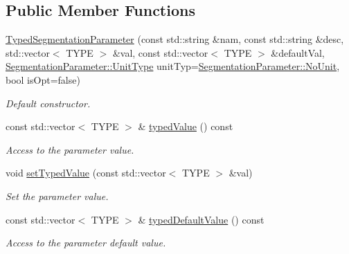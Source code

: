 \subsection*{Public Member Functions}
\begin{DoxyCompactItemize}
\item 
\hyperlink{class_d_d4hep_1_1_d_d_segmentation_1_1_typed_segmentation_parameter_3_01std_1_1vector_3_01_t_y_p_e_01_4_01_4_a4deba5d43284deab4fba1c05f0cbb563}{Typed\+Segmentation\+Parameter} (const std\+::string \&nam, const std\+::string \&desc, std\+::vector$<$ T\+Y\+PE $>$ \&val, const std\+::vector$<$ T\+Y\+PE $>$ \&default\+Val, \hyperlink{class_d_d4hep_1_1_d_d_segmentation_1_1_segmentation_parameter_a36f5f8b8d812b2a2b81363377565d8d4}{Segmentation\+Parameter\+::\+Unit\+Type} unit\+Typ=\hyperlink{class_d_d4hep_1_1_d_d_segmentation_1_1_segmentation_parameter_a36f5f8b8d812b2a2b81363377565d8d4ab217a538e0ac077135786260a2221c14}{Segmentation\+Parameter\+::\+No\+Unit}, bool is\+Opt=false)
\begin{DoxyCompactList}\small\item\em Default constructor. \end{DoxyCompactList}\item 
const std\+::vector$<$ T\+Y\+PE $>$ \& \hyperlink{class_d_d4hep_1_1_d_d_segmentation_1_1_typed_segmentation_parameter_3_01std_1_1vector_3_01_t_y_p_e_01_4_01_4_ad28706ead2996fc42cee6a75325511ca}{typed\+Value} () const
\begin{DoxyCompactList}\small\item\em Access to the parameter value. \end{DoxyCompactList}\item 
void \hyperlink{class_d_d4hep_1_1_d_d_segmentation_1_1_typed_segmentation_parameter_3_01std_1_1vector_3_01_t_y_p_e_01_4_01_4_ab26ff43253babc240b2f92ff02b59d3b}{set\+Typed\+Value} (const std\+::vector$<$ T\+Y\+PE $>$ \&val)
\begin{DoxyCompactList}\small\item\em Set the parameter value. \end{DoxyCompactList}\item 
const std\+::vector$<$ T\+Y\+PE $>$ \& \hyperlink{class_d_d4hep_1_1_d_d_segmentation_1_1_typed_segmentation_parameter_3_01std_1_1vector_3_01_t_y_p_e_01_4_01_4_ad596757ec5212f42cbca088eb0f570c9}{typed\+Default\+Value} () const
\begin{DoxyCompactList}\small\item\em Access to the parameter default value. \end{DoxyCompactList}\item 

\end{DoxyCompactItemize}
